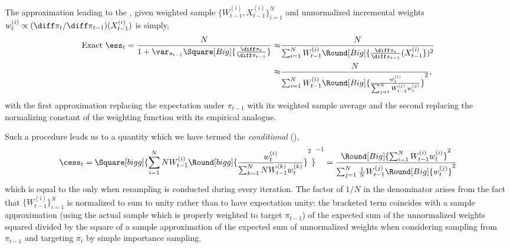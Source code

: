 The approximation leading to the \cess, given weighted sample
$\{W_{t-1}^{(i)},X_{t-1}^{(i)}\}_{i=1}^N$ and unnormalized incremental weights
$w_{t}^{(i)} \propto (\diff\pi_t/\diff\pi_{t-1})(X_{t-1}^{(i)})$ is simply,
\begin{align*}
  \text{Exact }\ess_t = \frac{N}{1 + \var_{\pi_{t-1}}
    \Square[Big]{\frac{\diff\pi_t}{\diff\pi_{t-1}}}}
  \approx& \frac{N}{\sum_{i=1}^N W_{t-1}^{(i)}
    \Round[Big]{\frac{\diff\pi_t}{\diff\pi_{t-1}}(X_{t-1}^{(i)}})^2}\\
  \approx& \frac{N}{\sum_{i=1}^N W_{t-1}^{(i)}
    \Round[Big]{\frac{w_t^{(i)}}{\sum_{j=1}^N W_{t-1}^{(j)} w_t^{(j)}}}^2},
\end{align*}
with the first approximation replacing the expectation under $\pi_{t-1}$ with
its weighted sample average and the second replacing the normalizing constant
of the weighting function with its empirical analogue.

Such a procedure leads us to a quantity which we have termed the
\emph{conditional} \ess (\cess),
\begin{equation}
  \cess_t = \Square[bigg]{\sum_{i=1}^N N W_{t-1}^{(i)} \Round[bigg]{
        \frac{w_t^{(i)}}{\sum_{k=1}^N N W_{t-1}^{(k)}w_t^{(k)}}}^2}^{-1}
  = \frac{\Round[Big]{\sum_{i=1}^NW_{t-1}^{(i)}w_t^{(i)}}^2}
  {\sum_{j=1}^N \frac{1}{N} W_{t-1}^{(j)} \Round[Big]{w_t^{(j)}}^2}
\end{equation}
which is equal to the \ess only when resampling is conducted during every
iteration. The factor of $1/N$ in the denominator arises from the fact that
$\{W_{t-1}^{(i)}\}_{i=1}^N$ is normalized to sum to unity rather than to have
expectation unity: the bracketed term coincides with a sample approximation
(using the actual sample which is properly weighted to target $\pi_{t-1}$) of
the expected sum of the unnormalized weights squared divided by the square of
a sample approximation of the expected sum of unnormalized weights when
considering sampling from $\pi_{t-1}$ and targeting $\pi_t$ by simple
importance sampling.

